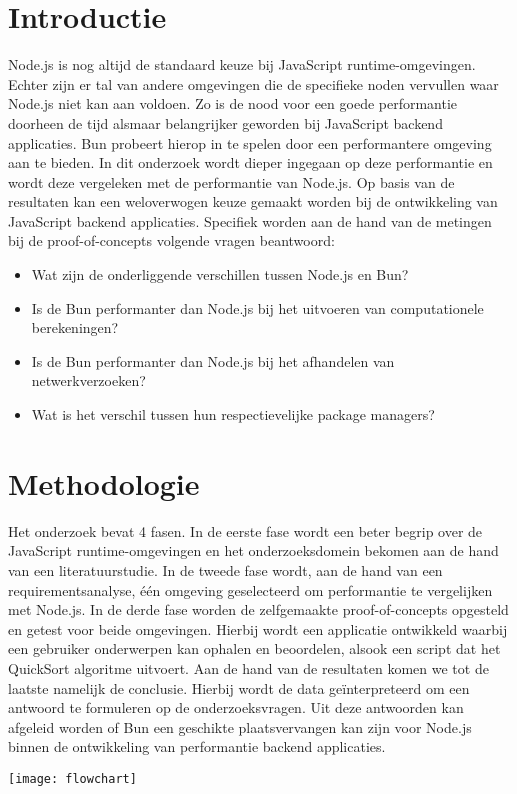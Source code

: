 \documentclass[a0,portrait]{hogent-poster}
\begin{document}
\begin{multicols}{2} %

\section{Introductie}
Node.js is nog altijd de standaard keuze bij JavaScript runtime-omgevingen. 
Echter zijn er tal van andere omgevingen die de specifieke noden vervullen waar Node.js niet kan aan voldoen.
Zo is de nood voor een goede performantie doorheen de tijd alsmaar belangrijker geworden bij JavaScript backend applicaties.
Bun probeert hierop in te spelen door een performantere omgeving aan te bieden. 
In dit onderzoek wordt dieper ingegaan op deze performantie en wordt deze vergeleken met de performantie van Node.js.
Op basis van de resultaten kan een weloverwogen keuze gemaakt worden bij de ontwikkeling van JavaScript backend applicaties.
Specifiek worden aan de hand van de metingen bij de proof-of-concepts volgende vragen beantwoord:
\begin{itemize}
  \item Wat zijn de onderliggende verschillen tussen Node.js en Bun?
  \item Is de Bun performanter dan Node.js bij het uitvoeren van computationele berekeningen?
  \item Is de Bun performanter dan Node.js bij het afhandelen van netwerkverzoeken?
  \item Wat is het verschil tussen hun respectievelijke package managers?
\end{itemize}
\section{Methodologie}
Het onderzoek bevat 4 fasen. 
In de eerste fase wordt een beter begrip over de JavaScript runtime-omgevingen en het onderzoeksdomein bekomen aan de hand van een literatuurstudie.
In de tweede fase wordt, aan de hand van een requirementsanalyse, één omgeving geselecteerd om performantie te vergelijken met Node.js.
In de derde fase worden de zelfgemaakte proof-of-concepts opgesteld en getest voor beide omgevingen. 
Hierbij wordt een applicatie ontwikkeld waarbij een gebruiker onderwerpen kan ophalen en beoordelen, alsook een script dat het QuickSort algoritme uitvoert.
Aan de hand van de resultaten komen we tot de laatste namelijk de conclusie. Hierbij wordt de data geïnterpreteerd om een antwoord te formuleren op de onderzoeksvragen.
Uit deze antwoorden kan afgeleid worden of Bun een geschikte plaatsvervangen kan zijn voor Node.js binnen de ontwikkeling van performantie backend applicaties.
\begin{center}
  \captionsetup{type=figure}
  \texttt{[image: flowchart]}
\end{center}



\end{multicols}
\end{document}
